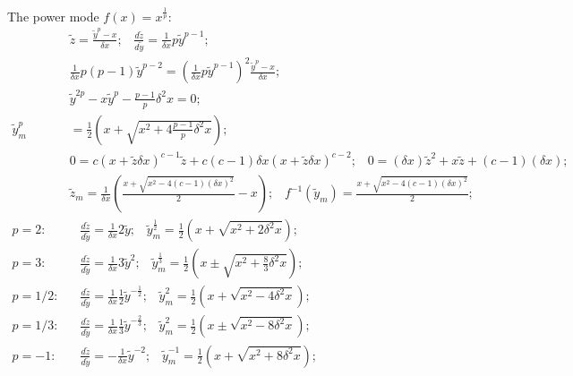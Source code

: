 \documentclass[twoside]{article}
\numberwithin{equation}{section}
\newcommand{\eqspace}{\;\;\;}
\begin{document}
The power mode $f(x) = x^{\frac{1}{p}}$:
\begin{align*}
& \tilde{z} = \frac{\tilde{y}^p - x}{\delta x}; \eqspace 
\frac{d \tilde{z}}{d \tilde{y}} = \frac{1}{\delta x} p \tilde{y}^{p-1}; \\
& \frac{1}{\delta x} p (p - 1) \tilde{y}^{p-2} = (\frac{1}{\delta x} p \tilde{y}^{p-1})^2 \frac{\tilde{y}^p - x}{\delta x}; \\
& \tilde{y}^{2p} - x \tilde{y}^{p} - \frac{p - 1}{p} \delta^2 x = 0; \\
\tilde{y}_m^p &= \frac{1}{2} (x + \sqrt{x^2 + 4 \frac{p - 1}{p} \delta^2 x}); \\
& 0 = c (x + \tilde{z} \delta x)^{c-1} \tilde{z} + c (c-1) \delta x (x + \tilde{z} \delta x)^{c-2}; \eqspace
0 = (\delta x) \tilde{z}^2 + x \tilde{z} + (c - 1) (\delta x); \\
& \tilde{z}_m = \frac{1}{\delta x}(\frac{x + \sqrt{x^2 - 4(c-1)(\delta x)^2}}{2} - x); \eqspace 
f^{-1}(\tilde{y}_m) = \frac{x + \sqrt{x^2 - 4(c-1)(\delta x)^2}}{2}; \\
p = 2:& \eqspace \frac{d \tilde{z}}{d \tilde{y}} = \frac{1}{\delta x} 2 \tilde{y}; \eqspace 
  \tilde{y}_m^{\frac{1}{2}} = \frac{1}{2} \left( x + \sqrt{x^2 + 2 \delta^2 x} \right); \\
p = 3:& \eqspace \frac{d \tilde{z}}{d \tilde{y}} = \frac{1}{\delta x} 3 \tilde{y}^2; \eqspace  
  \tilde{y}_m^{\frac{1}{3}} = \frac{1}{2} \left( x \pm \sqrt{x^2 + \frac{8}{3} \delta^2 x} \right); \\
p = 1/2:& \eqspace \frac{d \tilde{z}}{d \tilde{y}} = \frac{1}{\delta x} \frac{1}{2} \tilde{y}^{-\frac{1}{2}}; \eqspace 
  \tilde{y}_m^2 = \frac{1}{2} \left( x + \sqrt{x^2 - 4 \delta^2 x} \right); \\
p = 1/3:& \eqspace \frac{d \tilde{z}}{d \tilde{y}} = \frac{1}{\delta x} \frac{1}{3} \tilde{y}^{-\frac{2}{3}}; \eqspace
  \tilde{y}_m^2 = \frac{1}{2} \left( x \pm \sqrt{x^2 - 8 \delta^2 x} \right); \\
p = -1:& \eqspace \frac{d \tilde{z}}{d \tilde{y}} = - \frac{1}{\delta x} \tilde{y}^{-2}; \eqspace 
  \tilde{y}_m^{-1} = \frac{1}{2} \left( x + \sqrt{x^2 + 8 \delta^2 x} \right); 
\end{align*}
\end{document}
